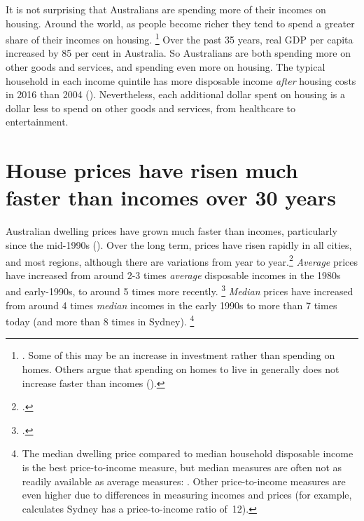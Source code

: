 It is not surprising that Australians are spending more of their incomes on housing.
Around the world, as people become richer they tend to spend a greater share of their incomes on housing.%
	\footnote{\textcites[][20]{Abelsonetal2005}{KohlerandvanderMerwe}. Some of this may be an increase in investment rather than spending on homes. Others argue that spending on homes to live in generally does not increase faster than incomes (\textcites{Albouy-2016-housing-demand}{Windsor-et-al-2013-homeprices}{Rosenthal2014PrivateMarkets}).}
Over the past 35 years, real GDP per capita increased by 85 per cent in Australia.
So Australians are both spending more on other goods and services, and spending even more on housing.
The typical household in each income quintile has more disposable income \emph{after} housing costs in 2016 than 2004 ().
Nevertheless, each additional dollar spent on housing is a dollar less to spend on other goods and services, from healthcare to entertainment.

\section{House prices have risen much faster than incomes over 30 years}\label{sec:house-prices-have-risen-much-faster-than-incomes-over-30-years}

Australian dwelling prices have grown much faster than incomes, particularly since the mid-1990s ().
Over the long term, prices have risen rapidly in all cities, and most regions, although there are variations from year to year.\footcite{Stapledon2012} \emph{Average} prices have increased from around 2-3 times \emph{average} disposable incomes in the 1980s and early-1990s, to around 5 times more recently.%
	\footcites{Kent2013Developments}{Ellis-2017-Speech-Aust-Housing-Researchers}{FoxFinlay2012}
\emph{Median} prices have increased from around 4 times \emph{median} incomes in the early 1990s to more than 7 times today (and more than 8 times in Sydney).%
	\footnote{The median dwelling price compared to median household disposable income is the best price-to-income measure, but median measures are often not as readily available as average measures: \textcite{CoreLogic2016-affordability}.
    Other price-to-income measures are even higher due to differences in measuring incomes and prices (for example, \textcite{Demographia-2017-13Annual} calculates Sydney has a price-to-income ratio of~12).}

